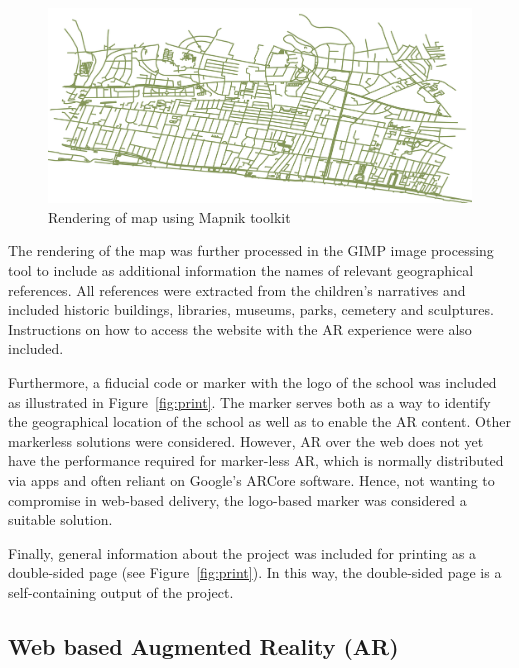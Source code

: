 \documentclass[acmlarge,screen,dvipsnames]{acmart}
\begin{document}
\begin{figure}[b]
\includegraphics[width=\linewidth]{images/maprender.jpg}
\caption{Rendering of map using Mapnik toolkit} \label{fig:map} 
\end{figure}
 
The rendering of the map was further processed in the GIMP image processing
tool \cite{gimp} to include as additional information the names of relevant
geographical references. All references were extracted from the children's
narratives and included historic buildings, libraries, museums, parks,
cemetery and sculptures. Instructions on how to access the website with the AR
experience were also included.

Furthermore, a fiducial code or marker with the logo of the school was
included as illustrated in Figure~\ref{fig:print}. The marker serves both as a
way to identify the geographical location of the school as well as to enable
the AR content. Other markerless solutions were considered. However, AR over
the web does not yet have the performance required for marker-less AR, which
is normally distributed via apps and often reliant on Google's ARCore
software. Hence, not wanting to compromise in web-based delivery, the
logo-based marker was considered a suitable solution.


Finally, general information about the project was included for printing as a
double-sided page (see Figure~\ref{fig:print}). In this way, the double-sided
page is a self-containing output of the project.





\subsection{Web based Augmented Reality (AR)} %
\end{document}
